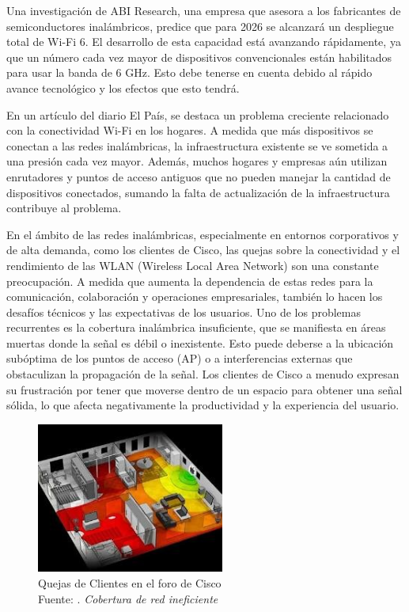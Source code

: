 Una investigación de ABI Research, una empresa que asesora a los fabricantes de semiconductores inalámbricos, predice que para 2026 se alcanzará un despliegue total de Wi-Fi 6. El desarrollo de esta capacidad está avanzando rápidamente, ya que un número cada vez mayor de dispositivos convencionales están habilitados para usar la banda de 6 GHz. Esto debe tenerse en cuenta debido al rápido avance tecnológico y los efectos que esto tendrá. \cite{ot_zig2020abi}

En un artículo del diario El País, se destaca un problema creciente relacionado con la conectividad Wi-Fi en los hogares. A medida que más dispositivos se conectan a las redes inalámbricas, la infraestructura existente se ve sometida a una presión cada vez mayor. Además, muchos hogares y empresas aún utilizan enrutadores y puntos de acceso antiguos que no pueden manejar la cantidad de dispositivos conectados, sumando la falta de actualización de la infraestructura contribuye al problema. \cite{ot_elpais2023wifi}

En el ámbito de las redes inalámbricas, especialmente en entornos corporativos y de alta demanda, como los clientes de Cisco, las quejas sobre la conectividad y el rendimiento de las WLAN (Wireless Local Area Network) son una constante preocupación. A medida que aumenta la dependencia de estas redes para la comunicación, colaboración y operaciones empresariales, también lo hacen los desafíos técnicos y las expectativas de los usuarios. Uno de los problemas recurrentes es la cobertura inalámbrica insuficiente, que se manifiesta en áreas muertas donde la señal es débil o inexistente. Esto puede deberse a la ubicación subóptima de los puntos de acceso (AP) o a interferencias externas que obstaculizan la propagación de la señal. Los clientes de Cisco a menudo expresan su frustración por tener que moverse dentro de un espacio para obtener una señal sólida, lo que afecta negativamente la productividad y la experiencia del usuario.  \cite{ot_cisco2022ap}

\begin{figure}[h]
	\begin{center}
		\includegraphics[width=0.55\textwidth]{1/figures/CISCO_QUEJAS.jpg}
		\caption[Quejas de Clientes en el foro de Cisco]{Quejas de Clientes en el foro de Cisco\\
		Fuente: \cite{ot_cisco2022ap}. \textit{Cobertura de red ineficiente}}
		\label{1:fig1}
	\end{center}
\end{figure}

